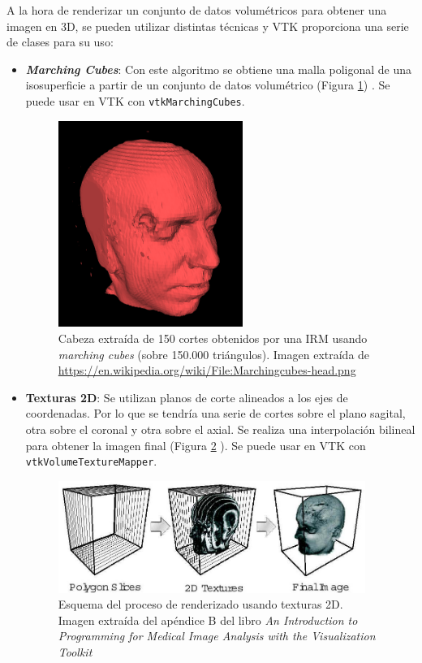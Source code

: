 A la hora de renderizar un conjunto de datos volumétricos para obtener una imagen en 3D, se pueden utilizar distintas técnicas y VTK proporciona una serie de clases para su uso:
\begin{itemize}
	\item \textbf{\textit{Marching Cubes}}: Con este algoritmo se obtiene una malla poligonal de una isosuperficie a partir de un conjunto de datos volumétrico (Figura \ref{fig:marching_cubes_head}) \cite{marching_cubes}. Se puede usar en VTK con \texttt{vtkMarchingCubes}.
	\begin{figure}[H]
		\centering
		\includegraphics[width=6cm]{imagenes/marching_cubes_head}
		\caption{Cabeza extraída de 150 cortes obtenidos por una IRM usando \textit{marching cubes} (sobre 150.000 triángulos). Imagen extraída de \url{https://en.wikipedia.org/wiki/File:Marchingcubes-head.png}}
		\label{fig:marching_cubes_head}
	\end{figure}
	
	\item \textbf{Texturas 2D}: Se utilizan planos de corte alineados a los ejes de coordenadas. Por lo que se tendría una serie de cortes sobre el plano sagital, otra sobre el coronal y otra sobre el axial. Se realiza una interpolación bilineal para obtener la imagen final (Figura \ref{fig:texturas2d} \cite{intro_medical_vtk_bioimage}). Se puede usar en VTK con \texttt{vtkVolumeTextureMapper}.
	\begin{figure}[H]
		\centering
		\includegraphics[width=10cm]{imagenes/texturas2d}
		\caption{Esquema del proceso de renderizado usando texturas 2D. Imagen extraída del apéndice B del libro \textit{An Introduction to Programming for Medical Image Analysis with the Visualization Toolkit }\cite{intro_medical_vtk_bioimage}}
		\label{fig:texturas2d}
	\end{figure}
	

\end{itemize}
